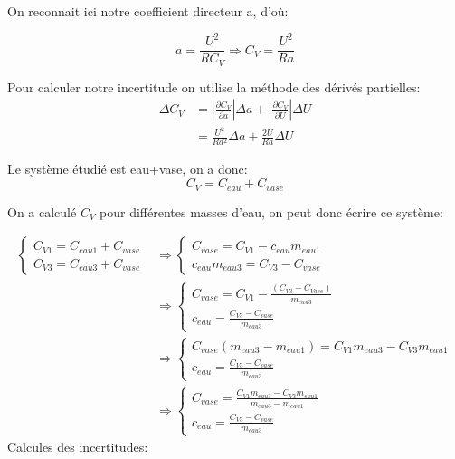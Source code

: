 \documentclass[12pt]{article}
\begin{document}
On reconnait ici notre coefficient directeur a, d'où:

\begin{equation}
a=\frac{U^2}{RC_V} \Rightarrow C_V=\frac{U^2}{Ra}
\end{equation}	

Pour calculer notre incertitude on utilise la méthode des dérivés partielles:
\begin{align*}
\Delta C_V &=\displaystyle\left\lvert \frac{\partial C_V}{\partial a}\right\rvert \Delta a + \displaystyle\left\lvert  \frac{\partial C_V}{\partial U}\right\rvert \Delta U \\
&=\frac{U^2}{Ra^2}\Delta a +\frac{2U}{Ra}\Delta U
\end{align*}

Le système étudié est {eau+vase}, on a donc:
\begin{equation}
C_V=C_{eau}+C_{vase}
\end{equation}

On a calculé $C_V$ pour différentes masses d'eau, on peut donc écrire ce système:

\begin{equation}
	\begin{split}
		\begin{cases}
			C_{V1}=C_{eau1}+C_{vase} \\
			C_{V3}=C_{eau3}+C_{vase}
		\end{cases} 
&\Rightarrow 
		\begin{cases}
			C_{vase}=C_{V1}-c_{eau}m_{eau1} \\
			c_{eau}m_{eau3}=C_{V3}-C_{vase}
		\end{cases} \\
&\Rightarrow 
		\begin{cases}
			C_{vase}=C_{V1}-\frac{(C_{V3}-C_{Vase})}{m_{eau3}} \\
			c_{eau}=\frac{C_{V3}-C_{vase}}{m_{eau3}}
		\end{cases} \\
&\Rightarrow 
		\begin{cases}
			C_{vase}(m_{eau3}-m_{eau1})=C_{V1}m_{eau3}-C_{V3}m_{eau1} \\
			c_{eau}=\frac{C_{V3}-C_{vase}}{m_{eau3}}
		\end{cases} \\
&\Rightarrow 		
		\begin{cases}
			C_{vase}=\frac{C_{V1}m_{eau3}-C_{V3}m_{eau1}}{m_{eau3}-m_{eau1}}  \\
			c_{eau}=\frac{C_{V3}-C_{vase}}{m_{eau3}}
		\end{cases}
	\end{split}	
\end{equation}
Calcules des incertitudes:
\end{document}
